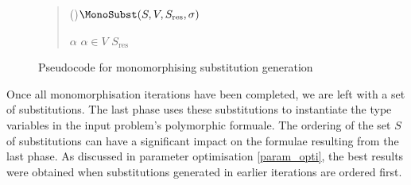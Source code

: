 \documentclass[]{ceurart}
\def\negvthinspace{\kern-0.083333em}
\begin{document}
\begin{figure}
\begin{quote}
   \begin{algorithm}[H]


   \Fn(){\(\MonoSubst(S, V, S_{\text{res}}, \sigma)\)}{


   \BlankLine

   \eIf{\(V = \emptyset\)}{
    \Return \(S_{\text{res}}\cup\{\sigma\}\)\;%
   }
   {
      \Let \(\alpha \) \ST \(\alpha\in V\)\;
      \ForEach{\(\sigma_{\negvthinspace\Delta}\in S\) \ST \(\alpha\in\Domain(\sigma_{\negvthinspace\Delta})\) \And \(\Compatible(\sigma,\sigma_{\negvthinspace\Delta})\)}{
         \textcolor{ourblueviolet}{
         \eIf{\(|S_{\text{res}}|<\Limit\)}{
            \textcolor{black}{
            \(S_{\text{res}}\leftarrow \MonoSubst(S, V\setminus\Domain(\sigma_{\negvthinspace\Delta}), S_{\text{res}}, \sigma_{\negvthinspace\Delta}\circ\sigma)\)\;}
         }
         {\Return \(S_{\text{res}}\)}}
      }
      \Return \(S_{\text{res}}\)\;
   }
   }


\end{algorithm}
\end{quote}
\caption{Pseudocode for monomorphising substitution generation}
\label{mono_substs}
\end{figure}

Once all monomorphisation iterations have been completed, we are left with a set of substitutions. The last phase uses these substitutions to instantiate the type variables in the input problem's polymorphic formuale. The ordering of the set \(S\) of substitutions can have a significant impact on the formulae resulting from the last phase. As discussed in parameter optimisation \ref{param_opti}, the best results were obtained when substitutions generated in earlier iterations are ordered first.
\end{document}
